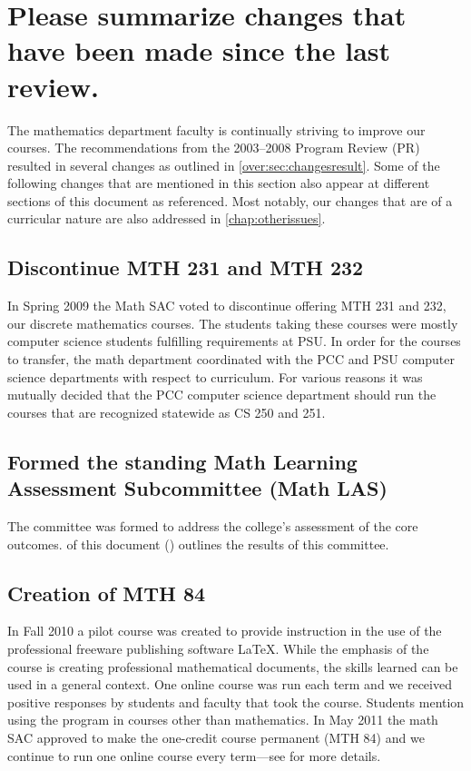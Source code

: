 
\section[Changes since the last program review]{Please summarize changes that have been made since the last
review.}
The mathematics department faculty is continually striving to improve our
courses.  The recommendations from the 2003--2008 Program Review (PR) \cite{mathprogramreview2003}
resulted in several changes as outlined in \vref{over:sec:changesresult}.  Some of the following
changes that are mentioned in this section also appear at different sections of this document
as referenced. Most notably, our changes that are of a curricular nature are also addressed in  \vref{chap:otherissues}.

\subsection{Discontinue MTH 231 and MTH 232} In Spring 2009
the Math SAC voted to discontinue offering MTH
231 and 232, our discrete mathematics courses.  The students taking these
courses were mostly computer science students fulfilling requirements at
PSU.  In order for the courses to transfer, the math department coordinated
with the PCC and PSU computer science departments with respect to
curriculum.  For various reasons it was mutually decided that the PCC
computer science department should run the courses that are recognized
statewide as CS 250 and 251.
\subsection{Formed the standing Math Learning Assessment Subcommittee
(Math LAS)}
The committee was formed to address the college's assessment of the core
outcomes.   of this document ()
outlines the results of this committee.
\subsection{Creation of MTH 84} In Fall 2010 a pilot course was created to provide
instruction in the use of the professional freeware publishing software
\LaTeX.   While the emphasis of the course is creating professional
mathematical documents, the skills learned can be used in a general context.
One online course was run each term and we received positive responses by
students and faculty that took the course.  Students mention using the
program in courses other than mathematics.   In May 2011 the math SAC
approved to make the one-credit course permanent (MTH 84) and we continue to run one
online course every term---see  for more details.
